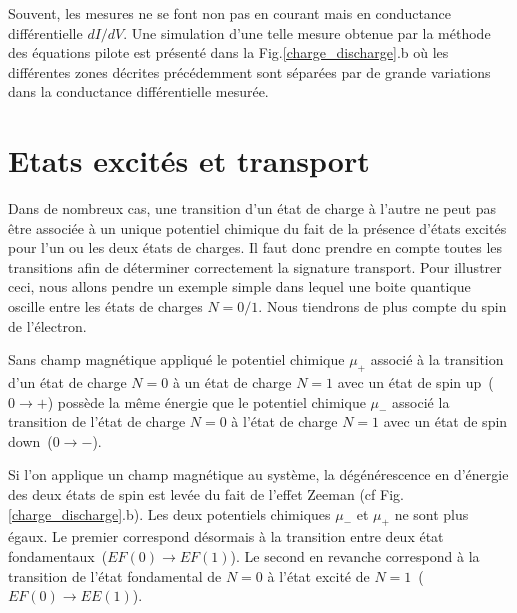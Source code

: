 Souvent, les mesures ne se font non pas en courant mais en conductance différentielle $dI/dV$. Une simulation d'une telle mesure obtenue par la méthode des équations pilote est présenté dans la  Fig.\ref{charge_discharge}.b où les différentes zones décrites précédemment sont séparées par de grande variations dans la conductance différentielle mesurée.\newline





\section{Etats excités et transport}

Dans de nombreux cas, une transition d'un état de charge à l'autre ne peut pas être associée à un unique potentiel chimique du fait de la présence d'états excités pour l'un ou les deux états de charges. Il faut donc prendre en compte toutes les transitions afin de déterminer correctement la signature transport. Pour illustrer ceci, nous allons pendre un exemple simple dans lequel une boite quantique oscille entre les états de charges $N=0/1$. Nous tiendrons de plus compte du spin de l'électron. 

Sans champ magnétique appliqué le potentiel chimique $\mu_{+}$ associé à la transition d'un état de charge $N=0$ à un état de charge $N=1$ avec un état de spin up~($0\rightarrow +$) possède la m\^eme énergie que le potentiel chimique  $\mu_{-}$ associé la transition de l'état de charge $N=0$ à l'état de charge $N=1$ avec un état de spin down~($0\rightarrow -$).


Si l'on applique un champ magnétique au système, la dégénérescence en d'énergie des deux états de spin est levée du fait de l'effet Zeeman (cf Fig. \ref{charge_discharge}.b). Les deux potentiels chimiques $\mu_{-}$ et $\mu_{+}$ ne sont plus égaux. Le premier correspond désormais à la transition entre deux état fondamentaux~($EF(0)\rightarrow EF(1)$). Le second en revanche correspond à la transition de l'état fondamental de $N=0$ à l'état excité de $N=1$~($EF(0)\rightarrow EE(1)$).


